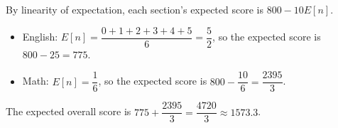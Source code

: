 By linearity of expectation, each section's expected score is $800-10E[n]$.
\begin{itemize}
\item English: $E[n]=\dfrac{0+1+2+3+4+5}{6}=\dfrac52$, so the expected score is $800-25=775$.
\item Math: $E[n]=\dfrac16$, so the expected score is $800-\dfrac{10}{6}=\dfrac{2395}{3}$.
\end{itemize}
The expected overall score is $775+\dfrac{2395}{3}=\boxed{\dfrac{4720}{3}}\approx1573.3$.
